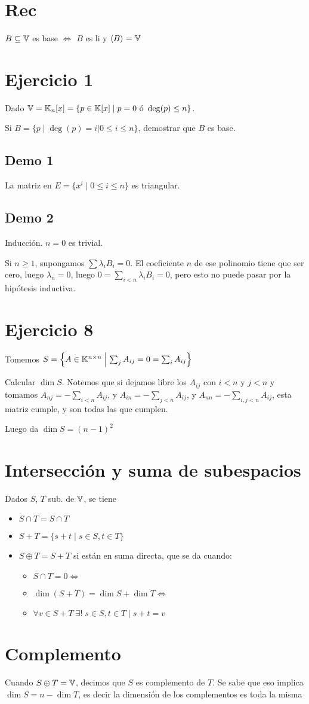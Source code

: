 \documentclass{article}
\begin{document}
\section{Rec}
$B \subseteq \mathbb{V}$ es base $\iff$ $B$ es li y $\langle B \rangle = \mathbb{V}$
\section{Ejercicio 1}
Dado $\mathbb{V} = \mathbb{K}_n[x] =  \{p \in \mathbb{K}[x] \mid p = 0 \text{ ó } \deg(p) \leq n\}$.

Si $B = \{p \mid \deg(p) = i | 0 \leq i \leq n\}$, demostrar que $B$ es base.
\subsection{Demo 1}
La matriz en $E = \{x^i \mid 0 \leq i \leq n\}$ es triangular.
\subsection{Demo 2}
Inducción. $n = 0$ es trivial.

Si $n \geq 1$, supongamos $\sum \lambda_iB_i = 0$. El coeficiente $n$ de ese polinomio
tiene que ser cero, luego $\lambda_n = 0$, luego $0 = \sum_{i < n} \lambda_iB_i = 0$,
pero esto no puede pasar por la hipótesis inductiva.

\section{Ejercicio 8}
Tomemos $S = \left\{A \in \mathbb{K}^{n \times n} \; \middle| \; \sum_j A_{ij} = 0 = \sum_i A_{ij}\right\}$

Calcular $\dim S$. Notemos que si dejamos libre los $A_{ij}$ con $i < n$ y $j < n$ y
tomamos $A_{nj} = -\sum_{i < n} A_{ij}$, y $A_{in} = -\sum_{j < n} A_{ij}$, y
$A_{nn} = -\sum_{i,j < n} A_{ij}$, esta matriz cumple, y son todas las que cumplen.

Luego da $\dim S = (n-1)^2$

\section{Intersección y suma de subespacios}
Dados $S$, $T$ sub. de $\mathbb{V}$, se tiene
\begin{itemize}
	\item $S \cap T = S \cap T$ 
	\item $S + T = \{s + t \mid s \in S, t \in T\}$
	\item $S \oplus T = S + T$ si están en suma directa, que se da cuando:
		\begin{itemize}
			\item $S \cap T = {0} \iff$
			\item $\dim (S + T) = \dim S + \dim T \iff$
			\item $\forall v \in S + T \; \exists! \; s \in S, t\in T \mid s + t = v$
		\end{itemize}
\end{itemize}

\section{Complemento}
Cuando $S \oplus T = \mathbb{V}$, decimos que $S$ es complemento de $T$. Se sabe que eso
implica $\dim S = n - \dim T$, es decir la dimensión de los complementos es toda la
misma
\end{document}
